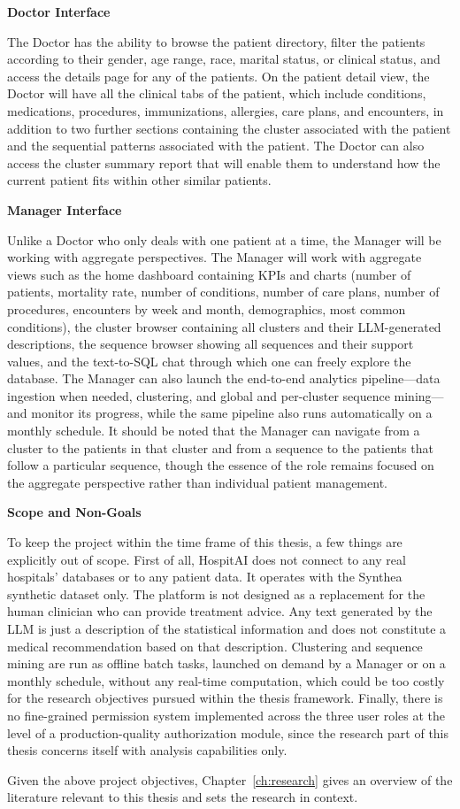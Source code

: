\vspace{0.5em}
\noindent\textbf{Doctor Interface}

The Doctor has the ability to browse the patient directory, filter the patients according to their gender, age range, race, marital status, or clinical status, and access the details page for any of the patients. On the patient detail view, the Doctor will have all the clinical tabs of the patient, which include conditions, medications, procedures, immunizations, allergies, care plans, and encounters, in addition to two further sections containing the cluster associated with the patient and the sequential patterns associated with the patient. The Doctor can also access the cluster summary report that will enable them to understand how the current patient fits within other similar patients.

\vspace{0.5em}
\noindent\textbf{Manager Interface}

Unlike a Doctor who only deals with one patient at a time, the Manager will be working with aggregate perspectives. The Manager will work with aggregate views such as the home dashboard containing KPIs and charts (number of patients, mortality rate, number of conditions, number of care plans, number of procedures, encounters by week and month, demographics, most common conditions), the cluster browser containing all clusters and their LLM-generated descriptions, the sequence browser showing all sequences and their support values, and the text-to-SQL chat through which one can freely explore the database. The Manager can also launch the end-to-end analytics pipeline---data ingestion when needed, clustering, and global and per-cluster sequence mining---and monitor its progress, while the same pipeline also runs automatically on a monthly schedule. It should be noted that the Manager can navigate from a cluster to the patients in that cluster and from a sequence to the patients that follow a particular sequence, though the essence of the role remains focused on the aggregate perspective rather than individual patient management.

\vspace{0.5em}
\noindent\textbf{Scope and Non-Goals}

To keep the project within the time frame of this thesis, a few things are explicitly out of scope. First of all, HospitAI does not connect to any real hospitals' databases or to any patient data. It operates with the Synthea synthetic dataset only. The platform is not designed as a replacement for the human clinician who can provide treatment advice. Any text generated by the LLM is just a description of the statistical information and does not constitute a medical recommendation based on that description. Clustering and sequence mining are run as offline batch tasks, launched on demand by a Manager or on a monthly schedule, without any real-time computation, which could be too costly for the research objectives pursued within the thesis framework. Finally, there is no fine-grained permission system implemented across the three user roles at the level of a production-quality authorization module, since the research part of this thesis concerns itself with analysis capabilities only.

Given the above project objectives, Chapter~\ref{ch:research} gives an overview of the literature relevant to this thesis and sets the research in context.
